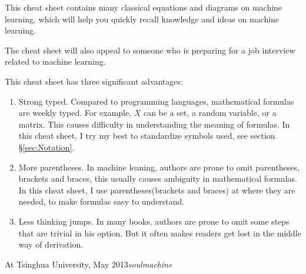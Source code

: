 %
%

\preface

This cheat sheet contains many classical equations and diagrams on machine learning, which will help you quickly recall knowledge and ideas on machine learning.

The cheat sheet will also appeal to someone who is preparing for a job interview related to machine learning. 

This cheat sheet has three significant advantages:
\begin{enumerate}
\item Strong typed. Compared to programming languages, mathematical formulas are weekly typed. For example, $X$ can be a set, a random variable, or a matrix. This causes difficulty in understanding the meaning of formulas. In this cheat sheet, I try my best to standardize symbols used, see section \S \ref{sec:Notation}.
\item More parentheses. In machine leaning, authors are prone to omit parentheses, brackets and braces,  this usually causes ambiguity in mathematical formulas. In this cheat sheet, I use parentheses(brackets and braces) at where they are needed, to make formulas easy to understand.
\item Less thinking jumps. In many books, authors are prone to omit some steps that are trivial in his option. But it often makes readers get lost in the middle way of derivation.
\end{enumerate}

\vspace{\baselineskip}
\begin{flushright}\noindent
At Tsinghua University, May 2013\hfill {\it soulmachine} \\
\end{flushright}


